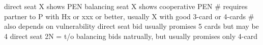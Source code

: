 direct seat X shows PEN
balancing seat X shows cooperative PEN
    # requires partner to P with Hx or xxx or better, usually X with good 3-card or 4-cards
    # also depends on vulnerability
direct seat bid usually promises 5 cards but may be 4
direct seat 2N = t/o
balancing bids natrually, but usually promises only 4-card